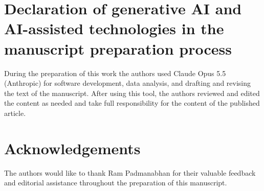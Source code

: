\documentclass[preprint,12pt]{elsarticle}
\theoremstyle{remark}
\begin{document}
\section*{Declaration of generative AI and AI-assisted technologies
in the manuscript preparation process} During the preparation of this work the
authors used Claude Opus 5.5 (Anthropic) for software development, data
analysis, and drafting and revising the text of the manuscript. After using this
tool, the authors reviewed and edited the content as needed and take full
responsibility for the content of the published article.

\section*{Acknowledgements}
The authors would like to thank Ram Padmanabhan for their valuable feedback and
editorial assistance throughout the preparation of this manuscript.



\end{document}
